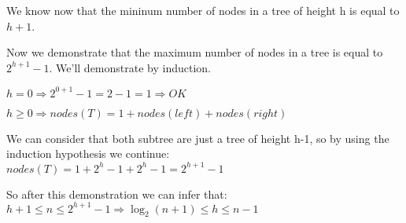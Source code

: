 \documentclass{article}
\begin{document}
We know now that the mininum number of nodes in a tree of height h is equal to $h+1$.\\
\begin{large}
Now we demonstrate that the maximum number of nodes in a tree is equal to $2^{h+1} -1$. We'll demonstrate by induction.\\
\begin{center}
$h = 0 \Rightarrow 2^{0+1} -1 = 2-1 = 1 \Rightarrow OK$

$ h \geq 0 \Rightarrow nodes(T) = 1 + nodes(left) + nodes(right)$ 

We can consider that both subtree are just a tree of height h-1, so by using the induction hypothesis we continue:\\

$nodes(T) = 1 + 2^h -1 + 2^h - 1 = 2^{h+1} - 1$

So after this demonstration we can infer that:\\ 
$h+1 \leq n \leq 2^{h+1} - 1 \Rightarrow \log_2(n+1) \leq h \leq n-1 $
\end{center}
\end{large}
\end{document}
